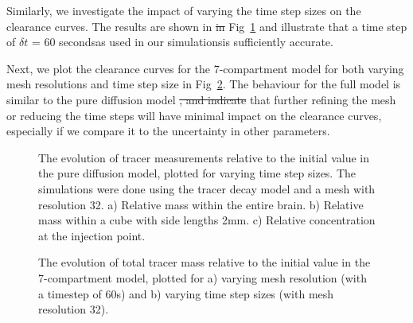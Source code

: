 \documentclass[a4paper,11pt]{article} %
\newcommand{\1}{^{(1)}}
\newcommand{\2}{^{(2)}}
\providecommand{\DIFaddtex}[1]{{\protect\color{blue}\uwave{#1}}} %
\providecommand{\DIFdeltex}[1]{{\protect\color{red}\sout{#1}}}                      %
\providecommand{\DIFaddbegin}{} %
\providecommand{\DIFaddend}{} %
\providecommand{\DIFdelbegin}{} %
\providecommand{\DIFdelend}{} %
\providecommand{\DIFaddFL}[1]{\DIFadd{#1}} %
\providecommand{\DIFaddbeginFL}{} %
\providecommand{\DIFaddendFL}{} %
\providecommand{\DIFdelendFL}{} %
\providecommand{\DIFadd}[1]{\texorpdfstring{\DIFaddtex{#1}}{#1}} %
\providecommand{\DIFdel}[1]{\texorpdfstring{\DIFdeltex{#1}}{}} %
\newcommand{\DIFscaledelfig}{0.5}
\newlength{\DIFdelgraphicswidth} %
\newlength{\DIFdelgraphicsheight} %
\newcommand{\DIFaddincludegraphics}[2][]{{\color{blue}\fbox{\DIFOincludegraphics[#1]{#2}}}} %
\newcommand{\DIFdelincludegraphics}[2][]{%
\sbox{\DIFdelgraphicsbox}{\DIFOincludegraphics[#1]{#2}}%
\settoboxwidth{\DIFdelgraphicswidth}{\DIFdelgraphicsbox} %
\settoboxtotalheight{\DIFdelgraphicsheight}{\DIFdelgraphicsbox} %
\scalebox{\DIFscaledelfig}{%
\parbox[b]{\DIFdelgraphicswidth}{\usebox{\DIFdelgraphicsbox}\\[-\baselineskip] \rule{\DIFdelgraphicswidth}{0em}}\llap{\resizebox{\DIFdelgraphicswidth}{\DIFdelgraphicsheight}{%
\setlength{\unitlength}{\DIFdelgraphicswidth}%
\begin{picture}(1,1)%
\thicklines\linethickness{2pt} %
{\color[rgb]{1,0,0}\put(0,0){\framebox(1,1){}}}%
{\color[rgb]{1,0,0}\put(0,0){\line( 1,1){1}}}%
{\color[rgb]{1,0,0}\put(0,1){\line(1,-1){1}}}%
\end{picture}%
}\hspace*{3pt}}} %
} %
\DeclareRobustCommand{\DIFaddbegin}{\DIFOaddbegin \let\includegraphics\DIFaddincludegraphics} %
\DeclareRobustCommand{\DIFaddend}{\DIFOaddend \let\includegraphics\DIFOincludegraphics} %
\DeclareRobustCommand{\DIFdelbegin}{\DIFOdelbegin \let\includegraphics\DIFdelincludegraphics} %
\DeclareRobustCommand{\DIFdelend}{\DIFOaddend \let\includegraphics\DIFOincludegraphics} %
\DeclareRobustCommand{\DIFaddbeginFL}{\DIFOaddbeginFL \let\includegraphics\DIFaddincludegraphics} %
\DeclareRobustCommand{\DIFaddendFL}{\DIFOaddendFL \let\includegraphics\DIFOincludegraphics} %
\DeclareRobustCommand{\DIFdelendFL}{\DIFOaddendFL \let\includegraphics\DIFOincludegraphics} %
\begin{document}
Similarly, we investigate the impact of varying the time step sizes on the clearance curves. The results are shown in \DIFdelbegin \DIFdel{in }\DIFdelend Fig~\ref{fig: diffusion time step size} and illustrate that a time step of $\delta t$ = 60 seconds\DIFaddbegin \DIFadd{, }\DIFaddend as used in our simulations\DIFaddbegin \DIFadd{, }\DIFaddend is sufficiently accurate.

Next, we plot the clearance curves for the 7-compartment model for both varying mesh resolutions and time step size in Fig~\ref{fig: 7comp convergence}. The behaviour for the full model is similar to the pure diffusion model \DIFdelbegin \DIFdel{, and indicate }\DIFdelend \DIFaddbegin \DIFadd{and indicates }\DIFaddend that further refining the mesh or reducing the time steps will have minimal impact on the clearance curves, especially if we compare it to the uncertainty in other parameters.

\DIFdelbegin %
\DIFdelendFL \DIFaddbeginFL \begin{figure}[hbt]
    \DIFaddendFL \centering
    \caption{The evolution of tracer measurements relative to the initial value in the pure diffusion model, plotted for varying time step sizes. The simulations were done using the tracer decay model and a mesh with resolution 32. a) Relative mass within the entire brain. b) Relative mass within a cube with side lengths \DIFaddbeginFL \DIFaddFL{of }\DIFaddendFL 2mm. c) Relative concentration at the injection point.}
    \label{fig: diffusion time step size}
\end{figure}


\DIFdelbegin %
\DIFdelendFL \DIFaddbeginFL \begin{figure}[hbt]
    \DIFaddendFL \centering
    \caption{The evolution of total tracer mass relative to the initial value in the 7-compartment model, plotted for a) varying mesh resolution (with a timestep of 60s) and b) varying time step sizes (with mesh resolution 32).}
    \label{fig: 7comp convergence}
\end{figure}
\end{document}
